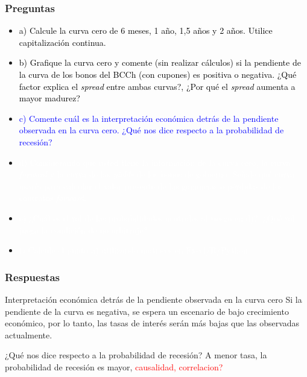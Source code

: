 \documentclass{beamer}
\begin{document}
\begin{frame}
  \frametitle{Preguntas}
  \begin{itemize}
    \scriptsize
    \item {\textcolor{black}{a) Calcule la curva cero de 6 meses, 1 año, 1,5 años y 2 años. Utilice capitalización continua.}}
    \vspace{3pt}
    \item {\textcolor{black}{b) Grafique la curva cero y comente (sin realizar cálculos) si la pendiente de la curva de los bonos del BCCh (con cupones) es positiva o negativa. ¿Qué factor explica el \textit{spread} entre ambas curvas?, ¿Por qué el \textit{spread} aumenta a mayor madurez?}}
    \vspace{3pt}
    \item {\Large\textcolor{blue}{c) Comente cuál es la interpretación económica detrás de la pendiente observada en la curva cero. 
    ¿Qué nos dice respecto a la probabilidad de recesión?}}
    \vspace{3pt}
    \item {\textcolor{white}{d) Considerando que usted tiene la información de la curva cero, la curva \textit{forward} y la curva de las \textit{yields} de los bonos de gobierno. Señale qué curva usaría para calcular el valor presente de las ganancias o pérdidas de los contratos \textit{forward}.}}
    \vspace{3pt}
    \item {\textcolor{white}{e) ¿Cuál es el rol de las probabilidades neutrales al riesgo en d)?, ¿Qué rol juega la condición de no arbitraje?}}
    \vspace{3pt}
    \item {\textcolor{white}{f) Calcule el punto a) utilizando matrices en Excel/R/Python.}}
    \vspace{3pt}
  \end{itemize}
\end{frame}

\begin{frame}
  \frametitle{Respuestas }
  \begin{block}{Interpretación económica detrás de la pendiente observada en la curva cero}
    Si la pendiente de la curva es negativa, se espera un escenario de bajo crecimiento
    económico, por lo tanto, las tasas de interés serán más bajas que las observadas
    actualmente.
  \end{block}
  \begin{block}{¿Qué nos dice respecto a la probabilidad de recesión?}
    A menor tasa, la probabilidad de recesión es mayor, \textcolor{red}{causalidad, correlacion?} 
  \end{block}
\end{frame}
\end{document}
